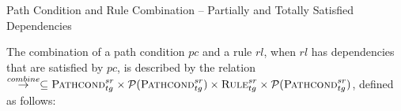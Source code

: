 \begin{definition}{Path Condition and Rule Combination -- Partially and Totally Satisfied Dependencies\\}
\label{def:rul_comb_partial_total}



% 
% 



The combination of a path condition $pc$ and a rule $rl$, when $rl$ has dependencies that are satisfied by $pc$, is described by the relation $\stackrel{combine}{\rightarrow}\subseteq \textsc{Pathcond}^{sr}_{tg} \times \mathcal{P}(\textsc{Pathcond}^{sr}_{tg}) \times \textsc{Rule}^{sr}_{tg} \times \mathcal{P}(\textsc{Pathcond}^{sr}_{tg})$, defined as follows:%



\end{definition}
